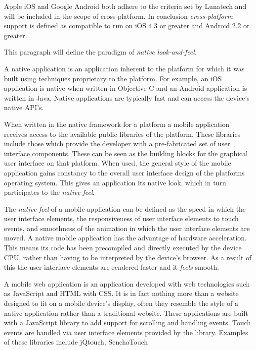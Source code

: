 Apple iOS and Google Android both adhere to the criteria set by Lunatech and will be included in the scope of cross-platform. In conclusion \emph{cross-platform} support is defined as compatible to run on iOS 4.3 or greater and Android 2.2 or greater.


This paragraph will define the paradigm of \emph{native look-and-feel}.

A native application is an application inherent to the platform for which it was built using techniques proprietary to the platform. For example, an iOS application is native when written in Objective-C and an Android application is written in Java.  Native applications are typically fast and can access the device's native API's.

When written in the native framework for a platform a mobile application receives access to the available public libraries of the platform. These libraries include those which provide the developer with a pre-fabricated set of user interface components. These can be seen as the building blocks for the graphical user interface on that platform. When used, the general style of the mobile application gains constancy to the overall user interface design of the platforms operating system. This gives an application its native look, which in turn participates to the \emph{native feel}.


The \emph{native feel} of a mobile application can be defined as the speed in which the user interface elements, the responsiveness of user interface elements to touch events, and smoothness of the animation in which the user interface elements are moved. A native mobile application has the advantage of hardware acceleration. This means its code has been precompiled and directly executed by the device CPU, rather than having to be interpreted by the device's browser. As a result of this the user interface elements are rendered faster and it \emph{feels} smooth.


A mobile web application is an application developed with web technologies such as JavaScript and HTML with CSS. It is in fact nothing more than a website designed to fit on a mobile device's display, often they resemble the style of a native application rather than a traditional website. These applications are built with a JavaScript library to add support for scrolling and handling events. Touch events are handled via user interface elements provided by the library. Examples of these libraries include jQtouch, SenchaTouch

